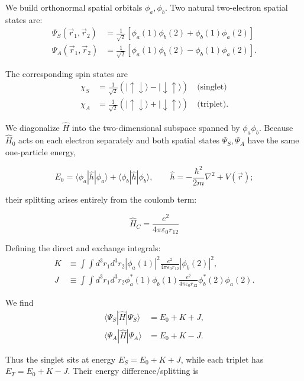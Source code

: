 \documentclass[svgnames]{article}
\begin{document}
We build orthonormal spatial orbitals  $\phi_a, \phi_b$. Two natural
two-electron spatial states are: 
\begin{align*}
    \Psi_S(\vec{r}_1, \vec{r}_2) &= \frac{1}{\sqrt{2}}\left[\phi_a(1)\phi_b(2) +
    \phi_b(1) \phi_a(2) \right] \\ 
        \Psi_A(\vec{r}_1, \vec{r}_2) &= \frac{1}{\sqrt{2}} \left[ \phi_a(1)
        \phi_b(2) - \phi_b(1) \phi_a(2) \right]. 
\end{align*} 

The corresponding spin states are 
\begin{align*}
    \chi_S &= \frac{1}{\sqrt{2}} (|\uparrow \downarrow\rangle - |\downarrow
    \uparrow \rangle) \quad \text{(singlet)} \\  
    \chi_A &= \frac{1}{\sqrt{2}} (|\uparrow \downarrow\rangle + |\downarrow
    \uparrow \rangle) \quad \text{(triplet)}. 
\end{align*}

We diagonalize $\hat{H}$ into the two-dimensional subspace spanned by
$\phi_a\phi_b$. Because  $\hat{H}_0$ acts on each electron separately and both
spatial states $\Psi_S, \Psi_A$ have the same one-particle energy, 

\[
E_0 = \langle \phi_a | \hat{h} | \phi_a\rangle + \langle \phi_b | \hat{h} |
\phi_b\rangle, \qquad \hat{h} = -\frac{\hbar^2}{2m}\nabla^2 + V(\vec{r});
\] \vspace{3px}

their splitting arises entirely from the coulomb term: 

\[
    \hat{H}_C = \frac{e^2}{4\pi\varepsilon_0 r_{12}}
\] \vspace{3px}

Defining the direct and exchange integrals: 
\begin{align*}
    K &\equiv \int \int d^3r_1 d^3r_2 |\phi_a(1)|^2 \frac{e^2}{4\pi\varepsilon_0
    r_{12}} |\phi_b(2)|^2, \\ 
        J &\equiv \int\int d^3r_1 d^3r_2 \phi_a^*(1) \phi_b(1)
        \frac{e^2}{4\pi\varepsilon_0r_{12}} \phi_b^*(2) \phi_a(2). 
\end{align*}

We find 
\begin{align*}
    \langle \Psi_S | \hat{H} | \Psi_S \rangle &= E_0 + K + J, \\
    \langle \Psi_A | \hat{H} | \Psi_A \rangle &= E_0 + K - J. 
\end{align*}

Thus the singlet sits at energy $E_S = E_0 + K + J$, while each triplet has $E_T
= E_0 + K - J$. Their energy difference/splitting is
\end{document}
